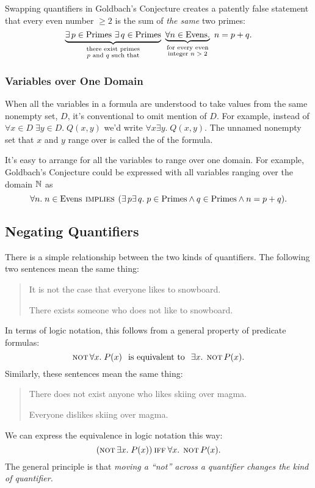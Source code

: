 Swapping quantifiers in Goldbach's Conjecture creates a patently false
statement that every even number $\geq 2$ is the sum of \emph{the same}
two primes:
\[
\underbrace{\exists\, p \in \text{Primes}\ \exists\, q \in \text{Primes}}_{\substack
    {\text{there exist primes} \\
     \text{$p$ and $q$ such that}}}
\
\underbrace{\forall n \in \text{Evens}.}_{\substack
    {\text{for every even} \\
     \text{integer $n > 2$}}}
\ n = p + q.
\]

\subsubsection{Variables over One Domain}
When all the variables in a formula are understood to take values from the
same nonempty set, $D$, it's conventional to omit mention of $D$.  For
example, instead of $\forall x \in D\; \exists y \in D.\; Q(x,y)$ we'd write
$\forall x \exists y.\; Q(x,y)$.  The unnamed nonempty set that $x$ and
$y$ range over is called the \term{domain} of the formula.

It's easy to arrange for all the variables to range over one domain.  For
example, Goldbach's Conjecture could be expressed with all variables
ranging over the domain $\mathbb{N}$ as
\[
\forall n.\; n \in \text{Evens} \mathbin{\mathrm{\textsc{\,implies\,}}} (\exists\, p \exists\, q.\; p \in \text{Primes} \land
q \in \text{Primes} \land n = p + q).
\]

\subsection{Negating Quantifiers}

There is a simple relationship between the two kinds of quantifiers.  The
following two sentences mean the same thing:
%
\begin{quote}

It is not the case that everyone likes to snowboard.

There exists someone who does not like to snowboard.

\end{quote}
%
In terms of logic notation, this follows from a general property of
predicate formulas:
%
\[
\mathop{\mathrm{\textsc{not}}} \forall x.\; P(x)
\hspace{0.1in} \text{is equivalent to} \hspace{0.1in}
\exists x.\; \mathop{\mathrm{\textsc{not}}} P(x).
\]
%
Similarly, these sentences mean the same thing:
%
\begin{quote}
There does not exist anyone who likes skiing over magma.

Everyone dislikes skiing over magma.
\end{quote}
%
We can express the equivalence in logic notation this way:
%
\begin{equation}\label{nE}
(\mathop{\mathrm{\textsc{not}}} \exists x.\; P(x))  \mathbin{\mathrm{\textsc{iff}}}  \forall x.\; \mathop{\mathrm{\textsc{not}}} P(x).
\end{equation}
%
The general principle is that \textit{moving a ``not'' across a
quantifier changes the kind of quantifier.}

